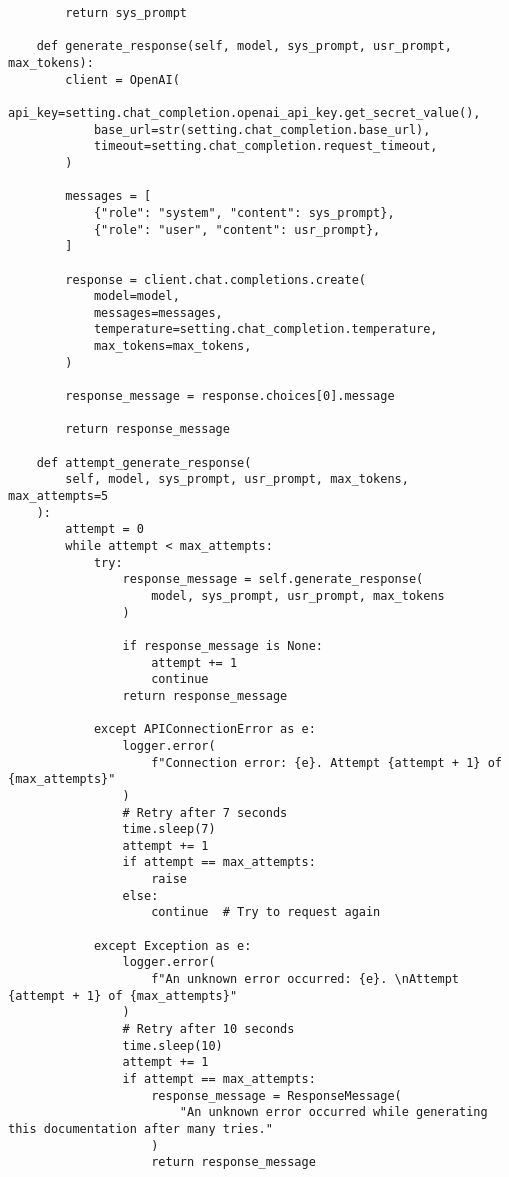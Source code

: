 \begin{verbatim}
        return sys_prompt

    def generate_response(self, model, sys_prompt, usr_prompt, max_tokens):
        client = OpenAI(
            api_key=setting.chat_completion.openai_api_key.get_secret_value(),
            base_url=str(setting.chat_completion.base_url),
            timeout=setting.chat_completion.request_timeout,
        )

        messages = [
            {"role": "system", "content": sys_prompt},
            {"role": "user", "content": usr_prompt},
        ]

        response = client.chat.completions.create(
            model=model,
            messages=messages,
            temperature=setting.chat_completion.temperature,
            max_tokens=max_tokens,
        )

        response_message = response.choices[0].message

        return response_message

    def attempt_generate_response(
        self, model, sys_prompt, usr_prompt, max_tokens, max_attempts=5
    ):
        attempt = 0
        while attempt < max_attempts:
            try:
                response_message = self.generate_response(
                    model, sys_prompt, usr_prompt, max_tokens
                )

                if response_message is None:
                    attempt += 1
                    continue
                return response_message

            except APIConnectionError as e:
                logger.error(
                    f"Connection error: {e}. Attempt {attempt + 1} of {max_attempts}"
                )
                # Retry after 7 seconds
                time.sleep(7)
                attempt += 1
                if attempt == max_attempts:
                    raise
                else:
                    continue  # Try to request again

            except Exception as e:
                logger.error(
                    f"An unknown error occurred: {e}. \nAttempt {attempt + 1} of {max_attempts}"
                )
                # Retry after 10 seconds
                time.sleep(10)
                attempt += 1
                if attempt == max_attempts:
                    response_message = ResponseMessage(
                        "An unknown error occurred while generating this documentation after many tries."
                    )
                    return response_message


\end{verbatim}
